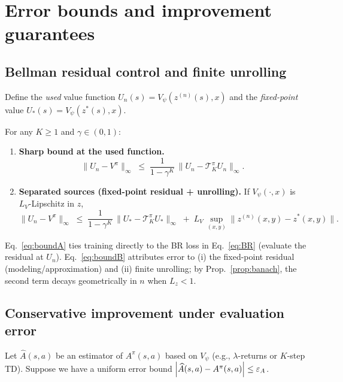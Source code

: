 \documentclass[11pt]{article}
\begin{document}
\section{Error bounds and improvement guarantees}

\subsection{Bellman residual control and finite unrolling}
Define the \emph{used} value function $U_n(s)=V_\psi(z^{(n)}(s),x)$ and the \emph{fixed-point} value $U_*(s)=V_\psi(z^*(s),x)$.

\begin{proposition}\label{prop:error_bounds}
For any $K\ge 1$ and $\gamma\in(0,1)$:
\begin{enumerate}
\item[\textbf{(A)}] \textbf{Sharp bound at the used function.}
\begin{equation}
\|U_n - V^\pi\|_\infty \;\le\; \frac{1}{1-\gamma^K}\,\bigl\|U_n-\mathcal T_K^\pi U_n\bigr\|_\infty.
\label{eq:boundA}
\end{equation}
\item[\textbf{(B)}] \textbf{Separated sources (fixed-point residual + unrolling).}
If $V_\psi(\cdot,x)$ is $L_V$-Lipschitz in $z$,
\begin{equation}
\|U_n - V^\pi\|_\infty
\;\le\; \frac{1}{1-\gamma^K}\,\bigl\|U_*-\mathcal T_K^\pi U_*\bigr\|_\infty
\;+\; L_V\,\sup_{(x,y)}\|z^{(n)}(x,y)-z^*(x,y)\|.
\label{eq:boundB}
\end{equation}
\end{enumerate}
\end{proposition}
\begin{remark}
Eq.~\eqref{eq:boundA} ties training directly to the BR loss in Eq.~\eqref{eq:BR} (evaluate the residual at $U_n$). Eq.~\eqref{eq:boundB} attributes error to (i) the fixed-point residual (modeling/approximation) and (ii) finite unrolling; by Prop.~\ref{prop:banach}, the second term decays geometrically in $n$ when $L_z<1$.
\end{remark}

\subsection{Conservative improvement under evaluation error}
Let $\widehat{A}(s,a)$ be an estimator of $A^\pi(s,a)$ based on $V_\psi$ (e.g., $\lambda$-returns or $K$-step TD). Suppose we have a uniform error bound
$\left\lvert \widehat{A}(s,a)-A^\pi(s,a) \right\rvert\le \varepsilon_A$.
\end{document}
